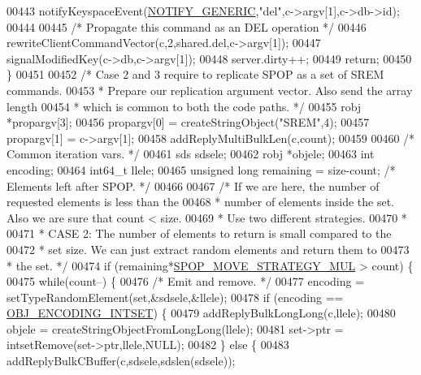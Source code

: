 \begin{DoxyCode}
00443         notifyKeyspaceEvent(\hyperlink{server_8h_a9fa53dd1068e62365f3964ad3479eec2}{NOTIFY\_GENERIC},\textcolor{stringliteral}{"del"},c->argv[1],c->db->id);
00444 
00445         \textcolor{comment}{/* Propagate this command as an DEL operation */}
00446         rewriteClientCommandVector(c,2,shared.del,c->argv[1]);
00447         signalModifiedKey(c->db,c->argv[1]);
00448         server.dirty++;
00449         \textcolor{keywordflow}{return};
00450     \}
00451 
00452     \textcolor{comment}{/* Case 2 and 3 require to replicate SPOP as a set of SREM commands.}
00453 \textcolor{comment}{     * Prepare our replication argument vector. Also send the array length}
00454 \textcolor{comment}{     * which is common to both the code paths. */}
00455     robj *propargv[3];
00456     propargv[0] = createStringObject(\textcolor{stringliteral}{"SREM"},4);
00457     propargv[1] = c->argv[1];
00458     addReplyMultiBulkLen(c,count);
00459 
00460     \textcolor{comment}{/* Common iteration vars. */}
00461     sds sdsele;
00462     robj *objele;
00463     \textcolor{keywordtype}{int} encoding;
00464     int64\_t llele;
00465     \textcolor{keywordtype}{unsigned} \textcolor{keywordtype}{long} remaining = size-count; \textcolor{comment}{/* Elements left after SPOP. */}
00466 
00467     \textcolor{comment}{/* If we are here, the number of requested elements is less than the}
00468 \textcolor{comment}{     * number of elements inside the set. Also we are sure that count < size.}
00469 \textcolor{comment}{     * Use two different strategies.}
00470 \textcolor{comment}{     *}
00471 \textcolor{comment}{     * CASE 2: The number of elements to return is small compared to the}
00472 \textcolor{comment}{     * set size. We can just extract random elements and return them to}
00473 \textcolor{comment}{     * the set. */}
00474     \textcolor{keywordflow}{if} (remaining*\hyperlink{t__set_8c_a335afb64760239e89abc51603161dd51}{SPOP\_MOVE\_STRATEGY\_MUL} > count) \{
00475         \textcolor{keywordflow}{while}(count--) \{
00476             \textcolor{comment}{/* Emit and remove. */}
00477             encoding = setTypeRandomElement(set,&sdsele,&llele);
00478             \textcolor{keywordflow}{if} (encoding == \hyperlink{server_8h_a214173987de21c3b7661fddd42b05873}{OBJ\_ENCODING\_INTSET}) \{
00479                 addReplyBulkLongLong(c,llele);
00480                 objele = createStringObjectFromLongLong(llele);
00481                 set->ptr = intsetRemove(set->ptr,llele,NULL);
00482             \} \textcolor{keywordflow}{else} \{
00483                 addReplyBulkCBuffer(c,sdsele,sdslen(sdsele));

\end{DoxyCode}

